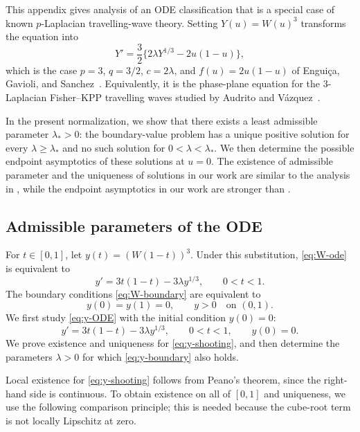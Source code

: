 \documentclass[12pt,preprint]{amsart}
\numberwithin{equation}{section}
\theoremstyle{plain}
\theoremstyle{definition}
\begin{document}
This appendix gives analysis of an ODE classification that is a special case of known $p$-Laplacian travelling-wave theory. Setting $Y(u)=W(u)^3$ transforms the equation into
\[
Y'=\frac32\{2\lambda Y^{1/3}-2u(1-u)\},
\]
which is the case $p=3$, $q=3/2$, $c=2\lambda$, and $f(u)=2u(1-u)$ of Enguiça, Gavioli, and Sanchez~\cite[Proposition~2 and Theorem~3.3]{EnguicaGavioliSanchez2013}. Equivalently, it is the phase-plane equation for the $3$-Laplacian Fisher--KPP travelling waves studied by Audrito and Vázquez~\cite[Theorem~2.1 and Section~3]{AudritoVazquez2017}. 

In the present normalization, we show that there exists a least admissible parameter $\lambda_*>0$: the
boundary-value problem has a unique positive solution for every
$\lambda\ge\lambda_*$ and no such solution for $0<\lambda<\lambda_*$.  We
then determine the possible endpoint asymptotics of these solutions at
$u=0$. The existence of admissible parameter and the uniqueness of solutions in our work are similar to the analysis in \cite{EnguicaGavioliSanchez2013}, while the endpoint asymptotics in our work are stronger than \cite{EnguicaGavioliSanchez2013}.

\subsection{Admissible parameters of the ODE}

For $t\in[0,1]$, let $y(t)=(W(1-t))^3$.  Under this substitution,
\eqref{eq:W-ode} is equivalent to
\begin{equation}
 y'=3t(1-t)-3\lambda y^{1/3}, \qquad 0<t<1.
 \label{eq:y-ODE}
\end{equation}
The boundary conditions \eqref{eq:W-boundary} are equivalent to
\begin{equation}
    \label{eq:y-boundary}
 y(0)=y(1)=0, \qquad y>0 \quad\text{on }(0,1).
\end{equation}
We first study \eqref{eq:y-ODE} with the initial condition $y(0)=0$:
\begin{equation}
 y'=3t(1-t)-3\lambda y^{1/3}, \qquad 0<t<1,\qquad y(0)=0.
 \label{eq:y-shooting}
\end{equation}
We prove existence and uniqueness for \eqref{eq:y-shooting}, and then
determine the parameters $\lambda>0$ for which \eqref{eq:y-boundary} also
holds.

Local existence for \eqref{eq:y-shooting} follows from Peano's theorem, since
the right-hand side is continuous.  To obtain existence on all of \([0,1]\) and
uniqueness, we use the following comparison principle; this is needed because
the cube-root term is not locally Lipschitz at zero.
\end{document}
